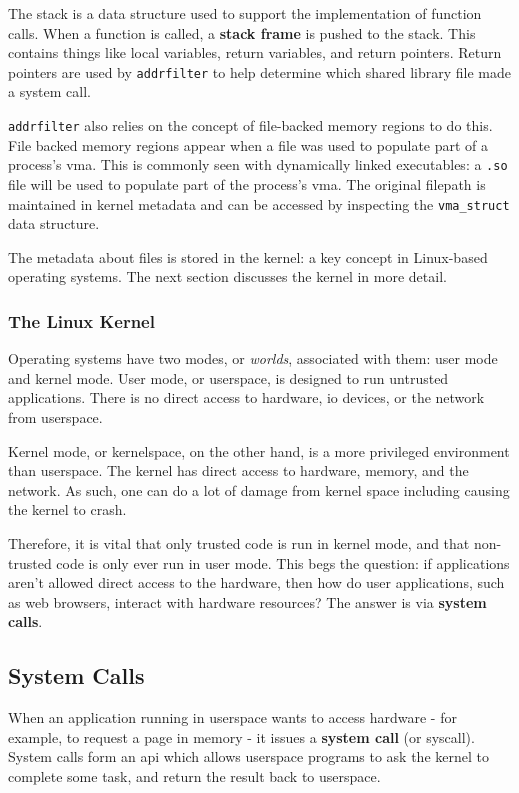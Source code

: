 The stack is a data structure used to support the implementation of function
calls. When a function is called, a \textbf{stack frame} is pushed to the
stack. This contains things like local variables, return variables, and
return pointers. Return pointers are used by \texttt{addrfilter} to help
determine which shared library file made a system call.

\texttt{addrfilter} also relies on the concept of file-backed memory regions 
to do this. File backed memory regions appear when a file was used to populate
part of a process's \ac{vma}. This is commonly seen with dynamically linked
executables: a \texttt{.so} file will be used to populate part of the
process's \ac{vma}. The original filepath is maintained in kernel metadata and
can be accessed by inspecting the \texttt{vma\_struct} data structure.

The metadata about files is stored in the kernel: a key concept in Linux-based
operating systems. The next section discusses the kernel in more detail.

\subsubsection{The Linux Kernel}
Operating systems have two modes, or \textit{worlds}, associated with them: user
mode and kernel mode. User mode, or userspace, is designed to run untrusted 
applications. There is no direct access to hardware, \ac{io} devices, or the 
network from userspace.

Kernel mode, or kernelspace, on the other hand, is a more privileged environment
than userspace. The kernel has direct access to hardware, memory, and the
network. As such, one can do a lot of damage from kernel space including causing
the kernel to crash.

Therefore, it is vital that only trusted code is run in kernel mode, and that
non-trusted code is only ever run in user mode. This begs the question: if
applications aren't allowed direct access to the hardware, then how do user
applications, such as web browsers, interact with hardware resources? The answer
is via \textbf{system calls}.

\subsection{System Calls}

When an application running in userspace wants to access hardware - for example,
to request a page in memory - it issues a \textbf{system call} (or syscall). System calls
form an \ac{api} which allows userspace programs to ask the kernel to complete some
task, and return the result back to userspace.

